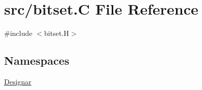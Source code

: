 \hypertarget{bitset_8_c}{}\section{src/bitset.C File Reference}
\label{bitset_8_c}
{\ttfamily \#include $<$bitset.\+H$>$}\newline
\subsection*{Namespaces}
\begin{DoxyCompactItemize}
\item 
 \hyperlink{namespace_designar}{Designar}
\end{DoxyCompactItemize}
